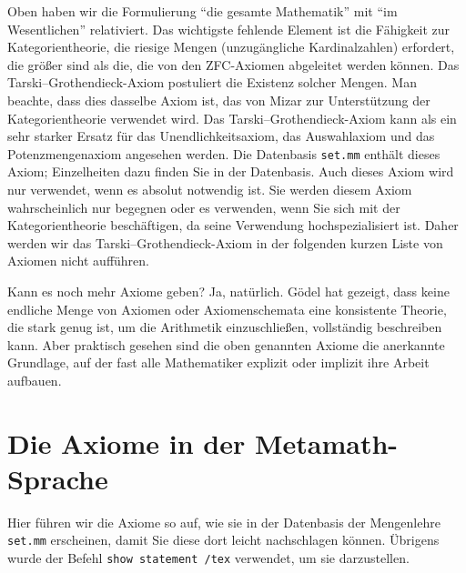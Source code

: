 Oben haben wir die Formulierung "`die gesamte Mathematik"' mit "`im Wesentlichen"' relativiert. Das wichtigste fehlende Element ist die Fähigkeit zur Kategorientheorie, die riesige Mengen (unzugängliche Kardinalzahlen) erfordert, die größer sind als die, die von den ZFC-Axiomen abgeleitet werden können. Das Tarski--Grothendieck-Axiom postuliert die Existenz solcher Mengen. Man beachte, dass dies dasselbe Axiom ist, das von Mizar zur Unterstützung der Kategorientheorie verwendet wird. Das Tarski--Grothendieck-Axiom kann als ein sehr starker Ersatz für das Unendlichkeitsaxiom, das Auswahlaxiom und das Potenzmengenaxiom angesehen werden. Die Datenbasis \texttt{set.mm} enthält dieses Axiom; Einzelheiten dazu finden Sie in der Datenbasis. Auch dieses Axiom wird nur verwendet, wenn es absolut notwendig ist. Sie werden diesem Axiom wahrscheinlich nur begegnen oder es verwenden, wenn Sie sich mit der Kategorientheorie beschäftigen, da seine Verwendung hochspezialisiert ist. Daher werden wir das Tarski--Grothendieck-Axiom in der folgenden kurzen Liste von Axiomen nicht auf\-führen.

Kann es noch mehr Axiome geben? Ja, natürlich. G\"{o}del hat gezeigt, dass keine endliche Menge von Axiomen oder Axiomenschemata eine konsistente Theorie, die stark genug ist, um die Arithmetik einzuschließen, vollständig beschreiben kann. Aber praktisch gesehen sind die oben genannten Axiome die anerkannte Grundlage, auf der fast alle Mathematiker explizit oder implizit ihre Arbeit aufbauen.

\section{Die Axiome in der Metamath-Sprache}\label{metaaxioms}

Hier führen wir die Axiome so auf, wie sie in der Datenbasis der Mengenlehre \texttt{set.mm} erscheinen, damit Sie diese dort leicht nachschlagen können.  Übrigens wurde der Befehl \texttt{show statement /tex} verwendet, um sie darzustellen.

\newbox\mlinebox
\newbox\mtrialbox
\newbox\startprefix  %
\newbox\contprefix  %
\def\startm{  %
  \setbox\mlinebox=\hbox{\unhcopy\startprefix}
}
\def\m#1{  %
  \setbox\mtrialbox=\hbox{\unhcopy\mlinebox $\,#1$}
  \ifdim\wd\mtrialbox>\hsize
    \box\mlinebox
    \setbox\mlinebox=\hbox{\unhcopy\contprefix $\,#1$}
  \else
    \setbox\mlinebox=\hbox{\unhbox\mtrialbox}
  \fi
}
\def\endm{  %
  \box\mlinebox
}

